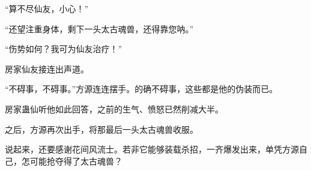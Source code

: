 \begin{this_body}
“算不尽仙友，小心！”

“还望注重身体，剩下一头太古魂兽，还得靠您呐。”

“伤势如何？我可为仙友治疗！”

房家仙友接连出声道。

“不碍事，不碍事。”方源连连摆手。的确不碍事，这些都是他的伪装而已。

房家蛊仙听他如此回答，之前的生气、愤怒已然削减大半。

之后，方源再次出手，将那最后一头太古魂兽收服。

说起来，还要感谢花间风流士。若非它能够装载杀招，一齐爆发出来，单凭方源自己，怎可能抢夺得了太古魂兽？

\end{this_body}

